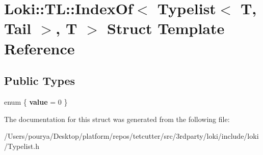 \hypertarget{structLoki_1_1TL_1_1IndexOf_3_01Typelist_3_01T_00_01Tail_01_4_00_01T_01_4}{}\section{Loki\+:\+:T\+L\+:\+:Index\+Of$<$ Typelist$<$ T, Tail $>$, T $>$ Struct Template Reference}
\label{structLoki_1_1TL_1_1IndexOf_3_01Typelist_3_01T_00_01Tail_01_4_00_01T_01_4}
\subsection*{Public Types}
\begin{DoxyCompactItemize}
\item 
\hypertarget{structLoki_1_1TL_1_1IndexOf_3_01Typelist_3_01T_00_01Tail_01_4_00_01T_01_4_aa1fb929cf7d377bcd780f7254580042d}{}enum \{ {\bfseries value} = 0
 \}\label{structLoki_1_1TL_1_1IndexOf_3_01Typelist_3_01T_00_01Tail_01_4_00_01T_01_4_aa1fb929cf7d377bcd780f7254580042d}

\end{DoxyCompactItemize}


The documentation for this struct was generated from the following file\+:\begin{DoxyCompactItemize}
\item 
/\+Users/pourya/\+Desktop/platform/repos/tetcutter/src/3rdparty/loki/include/loki/Typelist.\+h\end{DoxyCompactItemize}
